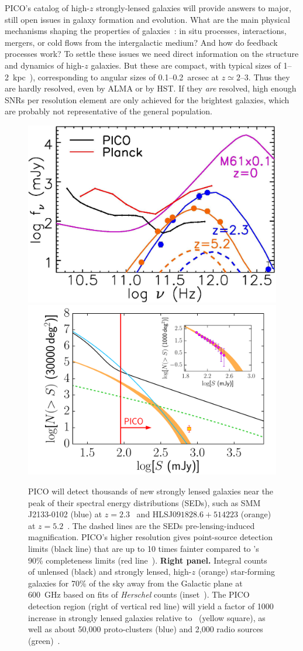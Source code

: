 \documentclass[PICOReport.tex]{subfiles}
\begin{document}
PICO's catalog of high-$z$ strongly-lensed galaxies will provide answers to major, still open issues in galaxy formation and evolution. What are the main physical mechanisms shaping the properties of galaxies~\citep{SilkMamon2012, SomervilleDave2015}: in situ processes, interactions, mergers, or cold flows  from the intergalactic medium? And how do feedback processes work? To settle these issues we need direct information on the structure and dynamics of high-$z$ galaxies. But these are compact, with typical sizes of 1--2~kpc~\cite{Fujimoto2018}), corresponding to angular sizes of 0.1--0.2~arcsec at $z\simeq 2$--3. Thus they are hardly resolved, even by ALMA or by HST. If they {\it are} resolved, high enough \ac{SNR}s per resolution element are only achieved for the brightest galaxies, which are probably not representative of the general population.
\begin{figure}[h]
\begin{center}
\includegraphics[width=0.41\columnwidth, trim={0 0 0 0cm}, clip]{images/fig_SED_PICO.jpg}
\hspace{0.75cm}
\includegraphics[width=0.4\columnwidth, trim={0 0 0 0cm}, clip]{images/NgtF_pico_NEW.pdf}
\vskip-0.3cm
\caption{  PICO will detect thousands of new strongly lensed galaxies near the peak of their spectral energy distributions (SEDs), such as SMM\,J2133-0102 (blue)  at $z=2.3$~\cite{Swinbank2010} and HLSJ$091828.6{+}514223$ (orange) at $z=5.2$~\cite{Combes2012}. The dashed lines are the SEDs pre-lensing-induced magnification. PICO's higher resolution gives point-source detection limits (black line) that are up to 10 times fainter compared to \planck 's 90\% completeness limits (red line~\cite{PCCS2}).   {\bf Right panel.} Integral counts of unlensed (black) and strongly lensed, high-$z$ (orange) star-forming galaxies for 70\% of the sky away from the Galactic plane at 600~GHz based on fits of \textit{Herschel} counts (inset~\citep{Negrello2017lensed}). The PICO detection region (right of vertical red line) will yield a factor of 1000 increase in strongly lensed galaxies relative to \planck~(yellow square), as well as about 50,000 proto-clusters (blue) and 2,000 radio sources (green)~\citep{Negrello2017protocl}. }

\end{center}
\end{figure}
\end{document}
